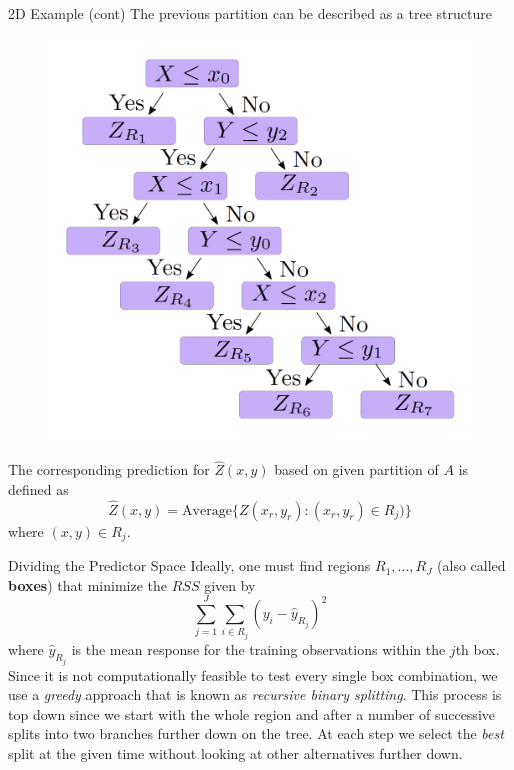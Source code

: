 \documentclass{beamer}
\begin{document}
\begin{frame}{2D Example (cont)}
The previous partition can be described as a tree structure
\begin{figure}[h]
	\centering
	\includegraphics[scale=0.3]{../../Figures/fig_tree_trans.png}
\end{figure}

The corresponding prediction for $\widehat{Z}(x,y)$ based on given partition of $A$ is defined as 
\begin{equation*}
	\widehat{Z}(x,y)= \textrm{Average} \{ Z(x_r,y_r)\colon (x_r ,y_r)\in R_j)\}
\end{equation*}
where $(x,y) \in R_j$.

\end{frame}

\begin{frame}{Dividing the Predictor Space}
	Ideally, one must find regions $R_1, \ldots, R_J$ (also called {\bf boxes}) that minimize the $RSS$ given by 
	\begin{equation*}
		\sum_{j=1}^J \sum_{i\in R_j} (y_i - \hat{y}_{R_j})^2
	\end{equation*}
where $\hat{y}_{R_j}$ is the mean response for the training observations within the $j$th box. Since it is not computationally feasible to test every single box combination, we use a {\it greedy} approach that is known as {\it recursive binary splitting}. This process is top down since we start with the whole region and after a number of successive splits into two branches further down on the tree. At each step we select the {\it best} split at the given time without looking at other alternatives further down. 
\end{frame}
\end{document}
